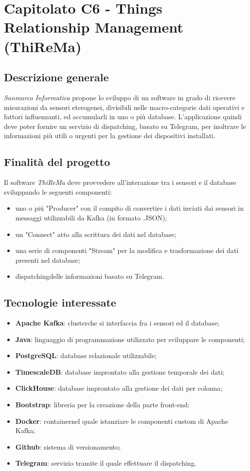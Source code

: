 \section{Capitolato C6 - Things Relationship Management (ThiReMa)}

\subsection{Descrizione generale}
\textit{Sanmarco Informatica} propone lo sviluppo di un software in grado di ricevere misurazioni da sensori eterogenei, divisibili nelle macro-categorie dati operativi e fattori influenzanti, ed accumularli in uno o più database. L'applicazione quindi deve poter fornire un servizio di dispatching\glos, basato su Telegram, per inoltrare le informazioni più utili o urgenti per la gestione dei dispositivi installati.

\subsection{Finalità del progetto}
Il software \textit{ThiReMa} deve provvedere all'interazione tra i sensori e il database sviluppando le seguenti componenti:
\begin{itemize}
	\item uno o piú "Producer" con il compito di convertire i dati inviati dai sensori in messaggi utilizzabili da Kafka (in formato .JSON);
	\item un "Connect" atto alla scrittura dei dati nel database;
	\item una serie di componenti "Stream" per la modifica e trasformazione dei dati presenti nel database;
	\item dispatching\glos delle informazioni basato su Telegram.
\end{itemize}

\subsection{Tecnologie interessate}
\begin{itemize}
	\item \textbf{Apache Kafka}: cluster\glo che si interfaccia fra i sensori ed il database;
	\item \textbf{Java}: linguaggio di programmazione utilizzato per sviluppare le componenti;
	\item \textbf{PostgreSQL}: database relazionale utilizzabile;
	\item \textbf{TimescaleDB}: database improntato alla gestione temporale dei dati;
	\item \textbf{ClickHouse}: database improntato alla gestione dei dati per colonna;
	\item \textbf{Bootstrap}: libreria per la creazione della parte front-end\glos;
	\item \textbf{Docker}: container\glo nel quale istanziare le componenti custom di Apache Kafka;
	\item \textbf{Github}: sistema di versionamento\glos;
	\item \textbf{Telegram}: servizio tramite il quale effettuare il dispatching\glos.
\end{itemize}

